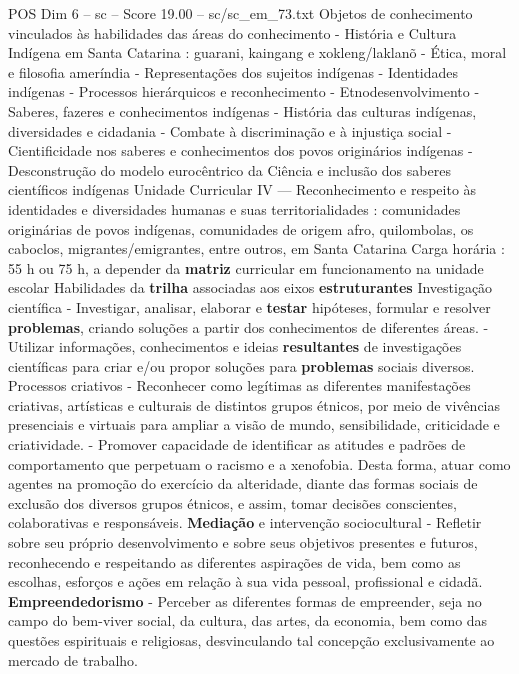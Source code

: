 \begin{textsample}{POS Dim 6 – sc – Score 19.00 – sc/sc\_em\_73.txt}
Objetos de conhecimento vinculados às habilidades das áreas do conhecimento - História e Cultura Indígena em Santa Catarina : guarani, kaingang e xokleng/laklanõ - Ética, moral e filosofia ameríndia - Representações dos sujeitos indígenas - Identidades indígenas - Processos hierárquicos e reconhecimento - Etnodesenvolvimento - Saberes, fazeres e conhecimentos indígenas - História das culturas indígenas, diversidades e cidadania - Combate à discriminação e à injustiça social - Cientificidade nos saberes e conhecimentos dos povos originários indígenas - Desconstrução do modelo eurocêntrico da Ciência e inclusão dos saberes científicos indígenas Unidade Curricular IV — Reconhecimento e respeito às identidades e diversidades humanas e suas territorialidades : comunidades originárias de povos indígenas, comunidades de origem afro, quilombolas, os caboclos, migrantes/emigrantes, entre outros, em Santa Catarina Carga horária : 55 h ou 75 h, a depender da \textbf{matriz} curricular em funcionamento na unidade escolar Habilidades da \textbf{trilha} associadas aos eixos \textbf{estruturantes} Investigação científica - Investigar, analisar, elaborar e \textbf{testar} hipóteses, formular e resolver \textbf{problemas}, criando soluções a partir dos conhecimentos de diferentes áreas. - Utilizar informações, conhecimentos e ideias \textbf{resultantes} de investigações científicas para criar e/ou propor soluções para \textbf{problemas} sociais diversos.
Processos criativos - Reconhecer como legítimas as diferentes manifestações criativas, artísticas e culturais de distintos grupos étnicos, por meio de vivências presenciais e virtuais para ampliar a visão de mundo, sensibilidade, criticidade e criatividade. - Promover capacidade de identificar as atitudes e padrões de comportamento que perpetuam o racismo e a xenofobia.
Desta forma, atuar como agentes na promoção do exercício da alteridade, diante das formas sociais de exclusão dos diversos grupos étnicos, e assim, tomar decisões conscientes, colaborativas e responsáveis. \textbf{Mediação} e intervenção sociocultural - Refletir sobre seu próprio desenvolvimento e sobre seus objetivos presentes e futuros, reconhecendo e respeitando as diferentes aspirações de vida, bem como as escolhas, esforços e ações em relação à sua vida pessoal, profissional e cidadã. \textbf{Empreendedorismo} - Perceber as diferentes formas de empreender, seja no campo do bem-viver social, da cultura, das artes, da economia, bem como das questões espirituais e religiosas, desvinculando tal concepção exclusivamente ao mercado de trabalho.

\end{textsample}
